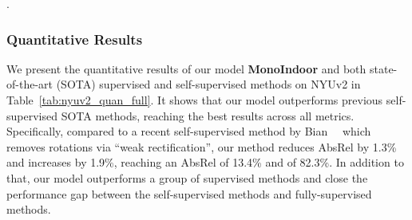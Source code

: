 \begin{table*}[!t]
    \caption{Comparison of our method to latest self-supervised methods on RGB-D 7-Scenes~\cite{Shotton_2013_CVPR}. Best results are in \textbf{bold}}.
    \label{tab:7scenes_quan_full}
    \centering
\end{table*}

\subsubsection{Quantitative Results}

We present the quantitative results of our model \textbf{MonoIndoor} and both state-of-the-art (SOTA) supervised and self-supervised methods on NYUv2 in Table~\ref{tab:nyuv2_quan_full}. It shows that our model outperforms previous self-supervised SOTA methods, reaching the best results across all metrics. Specifically, compared to a recent self-supervised method by Bian~\etal~\cite{bian2020unsupervised} which removes rotations via ``weak rectification'', our method reduces AbsRel by 1.3\% and increases  by 1.9\%, reaching an AbsRel of 13.4\%  and  of 82.3\%.  In addition to that, our model outperforms a group of supervised methods and close the performance gap between the self-supervised methods and fully-supervised methods. 

